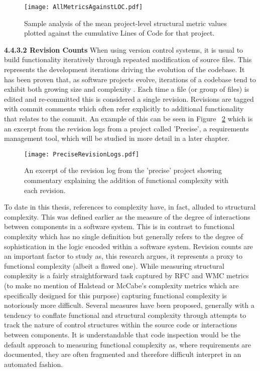 \begin{figure}[htbp!] 
\centering    
\texttt{[image: AllMetricsAgainstLOC.pdf]}
\caption{Sample analysis of the mean project-level structural metric values plotted against the cumulative Lines of Code for that project.}
\label{fig:AllMetricsAgainstLOC}
\end{figure}

\newline
\textbf{4.4.3.2 Revision Counts}
\newline
When using version control systems, it is usual to build functionality iteratively through repeated modification of source files. This represents the development iterations driving the evolution of the codebase. It has been proven that, as software projects evolve, iterations of a codebase tend to exhibit both growing size and complexity \citep{prather1984axiomatic}. Each time a file (or group of files) is edited and re-committed this is considered a single revision. Revisions are tagged with commit comments which often refer explicitly to additional functionality that relates to the commit. An example of this can be seen in Figure ~\ref{fig:PreciseRevisionLogs} which is an excerpt from the revision logs from a project called 'Precise', a requirements management tool, which will be studied in more detail in a later chapter.

\begin{figure}[htbp!] 
\centering    
\texttt{[image: PreciseRevisionLogs.pdf]}
\caption{An excerpt of the revision log from the 'precise' project showing commentary explaining the addition of functional complexity with each revision.}
\label{fig:PreciseRevisionLogs}
\end{figure}

To date in this thesis, references to complexity have, in fact, alluded to structural complexity. This was defined earlier as the measure of the degree of interactions between components in a software system. This is in contrast to functional complexity which has no single definition but generally refers to the degree of sophistication in the logic encoded within a software system. Revision counts are an important factor to study as, this research argues, it represents a proxy to functional complexity (albeit a flawed one). While measuring structural complexity is a fairly straightforward task captured by RFC and WMC metrics (to make no mention of Halstead or McCabe's complexity metrics which are specifically designed for this purpose) capturing functional complexity is notoriously more difficult. Several measures have been proposed, generally with a tendency to conflate functional and structural complexity through attempts to track the nature of control structures within the source code or interactions between components. It is understandable that code inspection would be the default approach to measuring functional complexity as, where requirements are documented, they are often fragmented and therefore difficult interpret in an automated fashion. 

